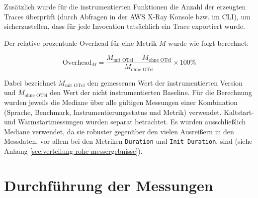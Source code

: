 Zusätzlich wurde für die instrumentierten Funktionen die Anzahl der erzeugten Traces überprüft (durch Abfragen in der AWS X-Ray 
Konsole bzw. im CLI), um sicherzustellen, dass für jede Invocation tatsächlich ein Trace exportiert wurde.

Der relative prozentuale Overhead für eine Metrik \(M\) wurde wie folgt berechnet:

\begin{equation}
\text{Overhead}_{M} = \frac{M_{\text{mit OTel}} - M_{\text{ohne OTel}}}{M_{\text{ohne OTel}}} \times 100\%
\label{eq:overhead}
\end{equation}

Dabei bezeichnet \(M_{\text{mit OTel}}\) den gemessenen Wert der instrumentierten Version und \(M_{\text{ohne OTel}}\) 
den Wert der nicht instrumentierten Baseline. Für die Berechnung wurden jeweils die Mediane über alle gültigen Messungen 
einer Kombination (Sprache, Benchmark, Instrumentierungsstatus und Metrik) verwendet. Kaltstart- und Warmstartmessungen wurden separat 
betrachtet. Es wurden ausschließlich Mediane verwendet, da sie robuster gegenüber den vielen Ausreißern in den Messdaten, vor allem 
bei den Metriken \texttt{Duration} und \texttt{Init Duration}, sind (siehe Anhang \ref{sec:verteilung-rohe-messergebnisse}). 

\section{Durchführung der Messungen}
\label{sec:durchfuehrung}

